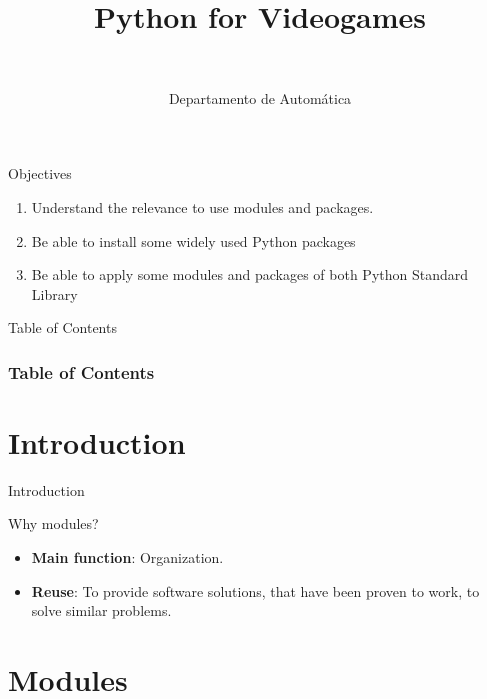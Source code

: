 \documentclass[10pt,compress]{beamer} %
\title[Python]{Python for Videogames}
\author{\asignatura\\\carrera}
\institute{}
\date{Departamento de Automática}
\begin{document}
{\titlepageBlue
    \begin{frame}
        \titlepage
    \end{frame}
}

\institute{\asignatura}

\begin{frame}[plain]{}
	\begin{block}{Objectives}
		\begin{enumerate}
		\item Understand the relevance to use modules and packages.
		\item Be able to install some widely used Python packages%
		\item Be able to apply some modules and packages of both Python Standard Library%
		\end{enumerate}
	\end{block}
\end{frame}

{
\begin{frame}[shrink]{Table of Contents}

 	\frametitle{Table of Contents}
  	\begin{multicols}{2}
  		\tableofcontents
    \end{multicols}

\end{frame}
}

\section{Introduction}
\begin{frame}{Introduction}
		\begin{block}{Why modules?}
			\begin{itemize}
			\item \textbf{Main function}: Organization.
			\item \textbf{Reuse}: To provide software solutions, that have been proven to work, to solve similar problems.
			\end{itemize}
		\end{block}
\end{frame}

\section{Modules}
\end{document}
